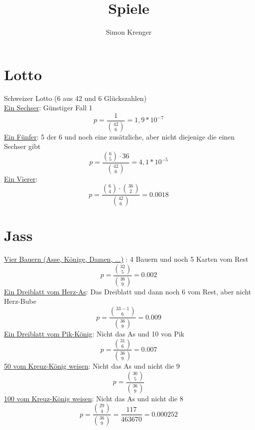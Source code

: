 \documentclass{article}
\title{Spiele}
\author{Simon Krenger}
\begin{document}
\section{Lotto}
Schweizer Lotto (6 aus 42 und 6 Glückszahlen)\\
\underline{Ein Sechser}: Günstiger Fall 1
\begin{equation}
p = \frac{1}{\binom{42}{6}} = 1,9 * 10^{-7}
\end{equation}
\underline{Ein Fünfer}: 5 der 6 und noch eine zusätzliche, aber nicht diejenige die einen Sechser gibt
\begin{equation}
p = \frac{\binom{6}{5} \cdot 36}{\binom{42}{6}} = 4,1 * 10^{-5}
\end{equation}
\underline{Ein Vierer}:
\begin{equation}
p = \frac{\binom{6}{4} \cdot \binom{36}{2}}{\binom{42}{6}} = 0.0018
\end{equation}

\section{Jass}
\underline{Vier Bauern (Asse, Könige, Damen, ...)} : 4 Bauern und noch 5 Karten vom Rest
\begin{equation}
p = \frac{\binom{32}{5}}{\binom{36}{9}} = 0.002
\end{equation}
\underline{Ein Dreiblatt vom Herz-As}: Das Dreiblatt und dann noch 6 vom Rest, aber nicht Herz-Bube
\begin{equation}
p = \frac{\binom{33-1}{6}}{\binom{36}{9}} = 0.009
\end{equation}
\underline{Ein Dreiblatt vom Pik-König}: Nicht das As und 10 von Pik	
\begin{equation}
p = \frac{\binom{31}{6}}{\binom{36}{9}} = 0.007
\end{equation}
\underline{50 vom Kreuz-König weisen}: Nicht das As und nicht die 9
\begin{equation}
p = \frac{\binom{30}{5}}{\binom{36}{9}}
\end{equation}
\underline{100 vom Kreuz-König weisen}: Nicht das As und nicht die 8
\begin{equation}
p = \frac{\binom{29}{4}}{\binom{36}{9}} = \frac{117}{463670} = 0.000252
\end{equation}
\end{document}
